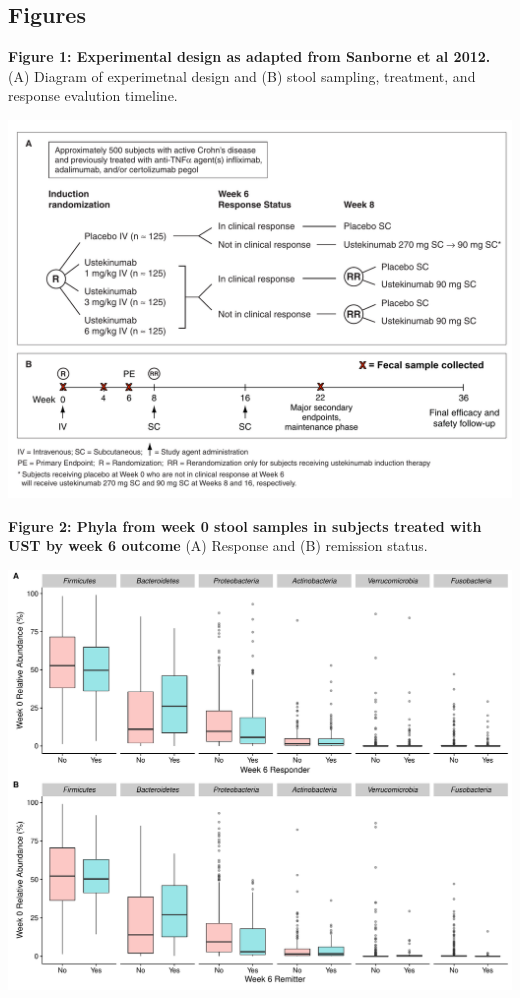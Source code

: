\documentclass[11pt,]{article}
\begin{document}
\newpage

\subsection{Figures}\label{figures}

\textbf{Figure 1: Experimental design as adapted from Sanborne et al
2012.} (A) Diagram of experimetnal design and (B) stool sampling,
treatment, and response evalution timeline.

\includegraphics{figures/Figure1_expdesign.pdf}

\newpage

\textbf{Figure 2: Phyla from week 0 stool samples in subjects treated
with UST by week 6 outcome} (A) Response and (B) remission status.

\includegraphics{figures/Figure2_wk6phyla.pdf}
\end{document}
